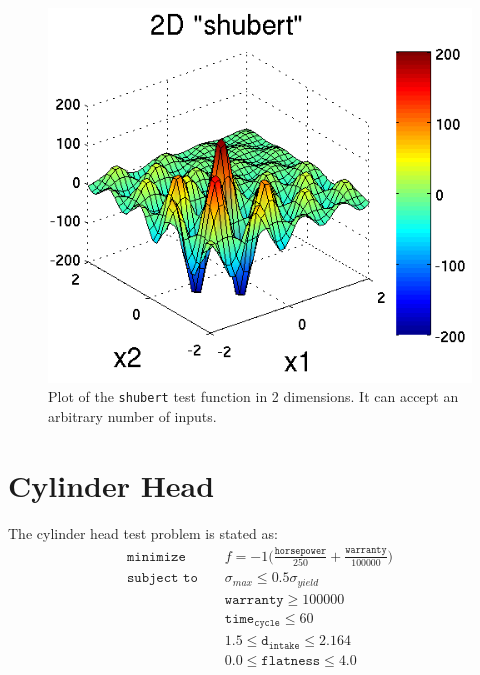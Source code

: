 \begin{figure}
  \centering
  \centerline{\includegraphics[scale=1.0]{images/DAK5pt2_2D_shubert}}
  \caption{Plot of the \texttt{shubert} test function in 2 dimensions.
           It can accept an arbitrary number of inputs.}
  \label{fig:2D_shubert}
\end{figure}

\section{Cylinder Head}\label{additional:cylinder}

The cylinder head test problem is stated as:
\begin{eqnarray}
\texttt{minimize }   & & f=-1\bigg(\frac{\mathtt{horsepower}}{250}+
  \frac{\mathtt{warranty}}{100000}\bigg) \nonumber\\
\texttt{subject to } & & \sigma_{max} \leq 0.5 \sigma_{yield}
  \label{additional:cylhead}\\
                     & & \mathtt{warranty} \geq 100000          \nonumber\\
                     & & \mathtt{time_{cycle}} \leq 60          \nonumber\\
                     & & 1.5 \leq \mathtt{d_{intake}} \leq 2.164\nonumber\\
                     & & 0.0 \leq \mathtt{flatness} \leq 4.0    \nonumber
\end{eqnarray}

